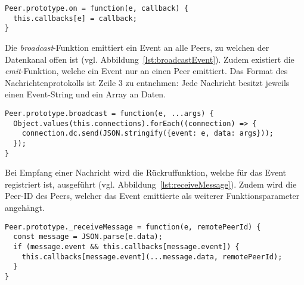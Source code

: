 \vspace{5pt}
\lstset{language=js, style=STYLE_CODE_JS}
\begin{singlespace}
\begin{lstlisting}[caption={Funktion zur Registrierung von Rückruffunktionen -- Peer.js}, captionpos=b, label={lst:registerCallback}]
Peer.prototype.on = function(e, callback) {
  this.callbacks[e] = callback;
}
\end{lstlisting}
\end{singlespace}

Die \textit{broadcast}-Funktion emittiert ein Event an alle Peers, zu welchen der Datenkanal offen ist (vgl. Abbildung~\ref{lst:broadcastEvent}). Zudem existiert die \textit{emit}-Funktion, welche ein Event nur an einen Peer emittiert. Das Format des Nachrichtenprotokolls ist Zeile 3 zu entnehmen: Jede Nachricht besitzt jeweils einen Event-String und ein Array an Daten.\par

\vspace{5pt}
\lstset{language=js, style=STYLE_CODE_JS}
\begin{singlespace}
\begin{lstlisting}[caption={Funktion zum Emittieren eines Events -- Peer.js}, captionpos=b, label={lst:broadcastEvent}]
Peer.prototype.broadcast = function(e, ...args) {
  Object.values(this.connections).forEach((connection) => {
    connection.dc.send(JSON.stringify({event: e, data: args}));
  });
}
\end{lstlisting}
\end{singlespace}

Bei Empfang einer Nachricht wird die Rückruffunktion, welche für das Event registriert ist, ausgeführt (vgl. Abbildung~\ref{lst:receiveMessage}). Zudem wird die Peer-ID des Peers, welcher das Event emittierte als weiterer Funktionsparameter angehängt.\par

\vspace{5pt}
\lstset{language=js, style=STYLE_CODE_JS}
\begin{singlespace}
\begin{lstlisting}[caption={Funktion bei Erhalt einer Nachricht -- Peer.js}, captionpos=b, label={lst:receiveMessage}]
Peer.prototype._receiveMessage = function(e, remotePeerId) {
  const message = JSON.parse(e.data);
  if (message.event && this.callbacks[message.event]) {
    this.callbacks[message.event](...message.data, remotePeerId);
  }
}
\end{lstlisting}
\end{singlespace}

